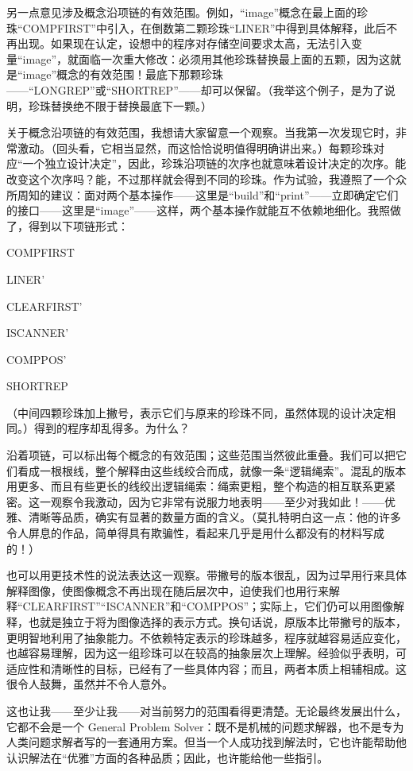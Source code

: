 \documentclass[twoside,11pt,fontset=none]{ctexbook}
\begin{document}
另一点意见涉及概念沿项链的有效范围。例如，“image”概念在最上面的珍珠“COMPFIRST”中引入，在倒数第二颗珍珠“LINER”中得到具体解释，此后不再出现。如果现在认定，设想中的程序对存储空间要求太高，无法引入变量“image”，就面临一次重大修改：必须用其他珍珠替换最上面的五颗，因为这就是“image”概念的有效范围！最底下那颗珍珠——“LONGREP”或“SHORTREP”——却可以保留。（我举这个例子，是为了说明，珍珠替换绝不限于替换最底下一颗。）

关于概念沿项链的有效范围，我想请大家留意一个观察。当我第一次发现它时，非常激动。（回头看，它相当显然，而这恰恰说明值得明确讲出来。）每颗珍珠对应“一个独立设计决定”，因此，珍珠沿项链的次序也就意味着设计决定的次序。能改变这个次序吗？能，不过那样就会得到不同的珍珠。作为试验，我遵照了一个众所周知的建议：面对两个基本操作——这里是“build”和“print”——立即确定它们的接口——这里是“image”——这样，两个基本操作就能互不依赖地细化。我照做了，得到以下项链形式：

COMPFIRST

LINER'

CLEARFIRST'

ISCANNER'

COMPPOS'

SHORTREP

\noindent
（中间四颗珍珠加上撇号，表示它们与原来的珍珠不同，虽然体现的设计决定相同。）得到的程序却乱得多。为什么？

沿着项链，可以标出每个概念的有效范围；这些范围当然彼此重叠。我们可以把它们看成一根根线，整个解释由这些线绞合而成，就像一条“逻辑绳索”。混乱的版本用更多、而且有些更长的线绞出逻辑绳索：绳索更粗，整个构造的相互联系更紧密。这一观察令我激动，因为它非常有说服力地表明——至少对我如此！——优雅、清晰等品质，确实有显著的数量方面的含义。（莫扎特明白这一点：他的许多令人屏息的作品，简单得具有欺骗性，看起来几乎是用什么都没有的材料写成的！）

也可以用更技术性的说法表达这一观察。带撇号的版本很乱，因为过早用行来具体解释图像，使图像概念不再出现在随后层次中，迫使我们也用行来解释“CLEARFIRST”“ISCANNER”和“COMPPOS”；实际上，它们仍可以用图像解释，也就是独立于将为图像选择的表示方式。换句话说，原版本比带撇号的版本，更明智地利用了抽象能力。不依赖特定表示的珍珠越多，程序就越容易适应变化，也越容易理解，因为这一组珍珠可以在较高的抽象层次上理解。经验似乎表明，可适应性和清晰性的目标，已经有了一些具体内容；而且，两者本质上相辅相成。这很令人鼓舞，虽然并不令人意外。

这也让我——至少让我——对当前努力的范围看得更清楚。无论最终发展出什么，它都不会是一个 General Problem Solver：既不是机械的问题求解器，也不是专为人类问题求解者写的一套通用方案。但当一个人成功找到解法时，它也许能帮助他认识解法在“优雅”方面的各种品质；因此，也许能给他一些指引。
\end{document}

